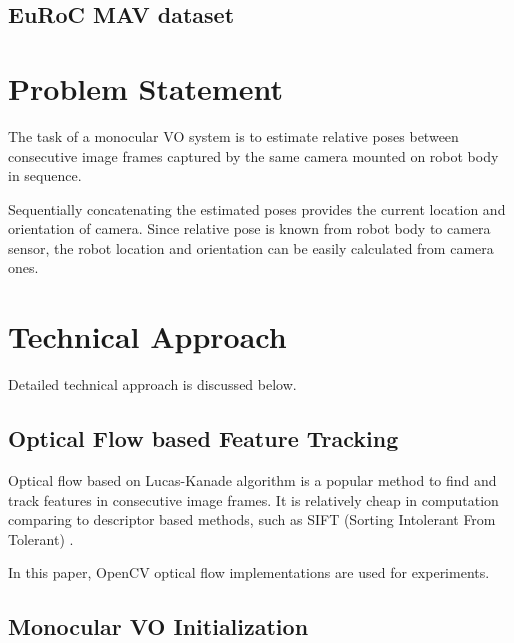 \documentclass[10pt,twocolumn,letterpaper]{article}
\begin{document}
\subsection{EuRoC MAV dataset}


\section{Problem Statement}

The task of a monocular VO system is to estimate relative poses between consecutive image frames captured by the same camera mounted on robot body in sequence. 

Sequentially concatenating the estimated poses provides the current location and orientation of camera. Since relative pose is known from robot body to camera sensor, the robot location and orientation can be easily calculated from camera ones. 



\section{Technical Approach}

Detailed technical approach is discussed below. 

\subsection{Optical Flow based Feature Tracking}

Optical flow based on Lucas-Kanade algorithm \cite{Lucas-1981-15101} is a popular method to find and track features in consecutive image frames. It is relatively cheap in computation comparing to descriptor based methods, such as SIFT (Sorting Intolerant From Tolerant) \cite{Lowe04distinctiveimage}. 

In this paper, OpenCV optical flow implementations \cite{OpenCV_optical_flow} are used for experiments. 



\subsection{Monocular VO Initialization}
\end{document}
